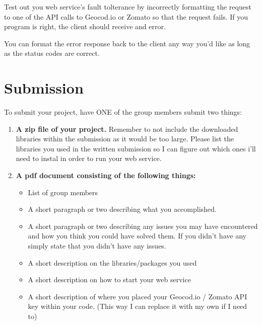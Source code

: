 \documentclass{article}
\begin{document}
\begin{info}
Test out you web service's fault tolterance by incorrectly formatting the request to one of the API calls to Geocod.io or Zomato so that the request fails. If you program is right, the client should receive and error. 
\end{info}

\begin{info}
You can format the error response back to the client any way you'd like as long as the status codes are correct. 
\end{info}






\section*{Submission } 
To submit your project, have ONE of the group members submit two things:

\begin{enumerate}
\item \textbf{A zip file of your project.} Remember to not include the downloaded libraries within the submission as it would be too large. Please list the libraries you used in the written submission so I can figure out which ones i'll need to instal in order to run your web service.
\item \textbf{A pdf document consisting of the following things:}
	\begin{itemize}
	\item List of group members
	\item A short paragraph or two describing what you accomplished.
	\item A short paragraph or two describing any issues you may have encountered and how you think you could have solved them. If you didn't have any simply state that you didn't have any issues.
	\item A short description on the libraries/packages you used
	\item A short description on how to start your web service
	\item A short description of where you placed your Geocod.io / Zomato API key within your code. (This way I can replace it with my own if I need to)
	\end{itemize}
\end{enumerate}
\end{document}
